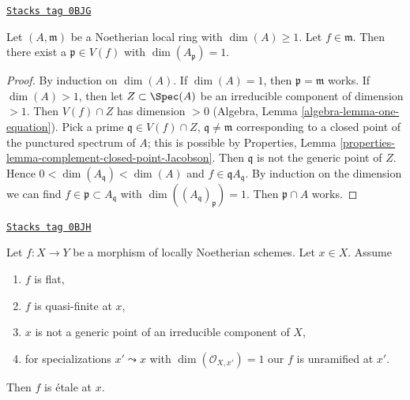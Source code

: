 \begin{lemma}
\label{pione-lemma-find-point-codim-1}
\href{https://stacks.math.columbia.edu/tag/0BJG}{\texttt{Stacks tag 0BJG}}

Let $(A, \mathfrak m)$ be a Noetherian local ring with $\dim(A) \geq 1$.
Let $f \in \mathfrak m$. Then there exist a $\mathfrak p \in V(f)$ with
$\dim(A_\mathfrak p) = 1$.
\end{lemma}

\begin{proof}
By induction on $\dim(A)$. If $\dim(A) = 1$, then $\mathfrak p = \mathfrak m$
works. If $\dim(A) > 1$, then let $Z \subset \Spec(A)$ be an irreducible
component of dimension $> 1$. Then $V(f) \cap Z$ has dimension $> 0$
(Algebra, Lemma \ref{algebra-lemma-one-equation}). Pick a prime
$\mathfrak q \in V(f) \cap Z$, $\mathfrak q \not = \mathfrak m$
corresponding to a closed point of the punctured spectrum of $A$;
this is possible by
Properties, Lemma \ref{properties-lemma-complement-closed-point-Jacobson}.
Then $\mathfrak q$ is not the generic point of $Z$. Hence
$0 < \dim(A_\mathfrak q) < \dim(A)$ and $f \in \mathfrak q A_\mathfrak q$.
By induction on the dimension we can find
$f \in \mathfrak p \subset A_\mathfrak q$ with
$\dim((A_\mathfrak q)_\mathfrak p) = 1$.
Then $\mathfrak p \cap A$ works.
\end{proof}

\begin{lemma}
\label{pione-lemma-ramification-quasi-finite-flat}
\href{https://stacks.math.columbia.edu/tag/0BJH}{\texttt{Stacks tag 0BJH}}

Let $f : X \to Y$ be a morphism of locally Noetherian schemes.
Let $x \in X$. Assume
\begin{enumerate}
\item $f$ is flat,
\item $f$ is quasi-finite at $x$,
\item $x$ is not a generic point of an irreducible component of $X$,
\item for specializations $x' \leadsto x$ with
$\dim(\mathcal{O}_{X, x'}) = 1$ our $f$ is unramified at $x'$.
\end{enumerate}
Then $f$ is \'etale at $x$.
\end{lemma}

